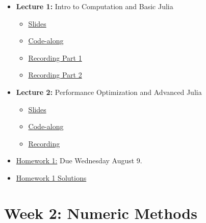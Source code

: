 \documentclass[
]{book}
\providecommand{\tightlist}{%
  \setlength{\itemsep}{0pt}\setlength{\parskip}{0pt}}
\begin{document}
\begin{itemize}
\tightlist
\item
  \textbf{Lecture 1:} Intro to Computation and Basic Julia

  \begin{itemize}
  \tightlist
  \item
    \href{https://kevinghunt.github.io/ComputationCamp/lectures/Lecture1.html}{Slides}
  \item
    \href{https://kevinghunt.github.io/ComputationCamp/codealongs/CodeAlong1.jl}{Code-along}
  \item
    \href{https://uwmadison.zoom.us/rec/share/YbH5nwK8MFfdrG_79ab21fIChvq_GLK2G0cj1PuRpy29LgDW2ddl46KoGUvMzWoz.uN0dl820cFXMQ54_}{Recording Part 1}
  \item
    \href{https://uwmadison.zoom.us/rec/share/grQK03ljFWrQB5hBKKgoAVy9BuR5hg85PgyVvQJrXqJ5olG1fCe9vh336wh_L_yH.8-wkiBg4GIsDT3eC}{Recording Part 2}
  \end{itemize}
\item
  \textbf{Lecture 2:} Performance Optimization and Advanced Julia

  \begin{itemize}
  \tightlist
  \item
    \href{https://kevinghunt.github.io/ComputationCamp/lectures/Lecture2.html}{Slides}
  \item
    \href{https://kevinghunt.github.io/ComputationCamp/codealongs/CodeAlong2.jl}{Code-along}
  \item
    \href{https://uwmadison.zoom.us/rec/share/ANmR1Qr-iDoAxMOItHY9zgQk41_bbABcPN4eD3mVE5OVLvhzcXr80yBSEjEi8Dc.V7Hy_3yeHQm84srl}{Recording}
  \end{itemize}
\item
  \href{https://kevinghunt.github.io/ComputationCamp/homeworks/homework1.html}{Homework 1:} Due Wednesday August 9.
\item
  \href{https://kevinghunt.github.io/ComputationCamp/homework_solutions/Homework1_solutions.jl}{Homework 1 Solutions}
\end{itemize}

\hypertarget{week-2-numeric-methods-1}{%
\section{Week 2: Numeric Methods}\label{week-2-numeric-methods-1}}
\end{document}
